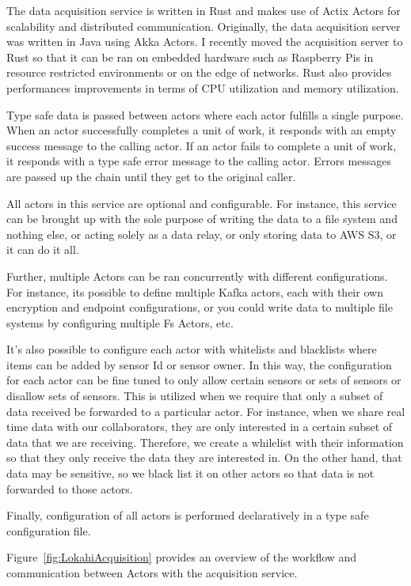 The data acquisition service is written in Rust and makes use of Actix Actors for scalability and distributed communication. Originally, the data acquisition server was written in Java using Akka Actors. I recently moved the acquisition server to Rust so that it can be ran on embedded hardware such as Raspberry Pis in resource restricted environments or on the edge of networks. Rust also provides performances improvements in terms of CPU utilization and memory utilization.

Type safe data is passed between actors where each actor fulfills a single purpose. When an actor successfully completes a unit of work, it responds with an empty success message to the calling actor. If an actor fails to complete a unit of work, it responds with a type safe error message to the calling actor. Errors messages are passed up the chain until they get to the original caller.

All actors in this service are optional and configurable. For instance, this service can be brought up with the sole purpose of writing the data to a file system and nothing else, or acting  solely as a data relay, or only storing data to AWS S3, or it can do it all.

Further, multiple Actors can be ran concurrently with different configurations. For instance, its possible to define multiple Kafka actors, each with their own encryption and endpoint configurations, or you could write data to multiple file systems by configuring multiple Fs Actors, etc.

It's also possible to configure each actor with whitelists and blacklists where items can be added by sensor Id or sensor owner. In this way, the configuration for each actor can be fine tuned to only allow certain sensors or sets of sensors or disallow sets of sensors. This is utilized when we require that only a subset of data received be forwarded to a particular actor. For instance, when we share real time data with our collaborators, they are only interested in a certain subset of data that we are receiving. Therefore, we create a whilelist with their information so that they only receive the data they are interested in. On the other hand, that data may be sensitive, so we black list it on other actors so that data is not forwarded to those actors.

Finally, configuration of all actors is performed declaratively in a type safe configuration file.

Figure~\ref{fig:LokahiAcquisition} provides an overview of the workflow and communication between Actors with the acquisition service.


